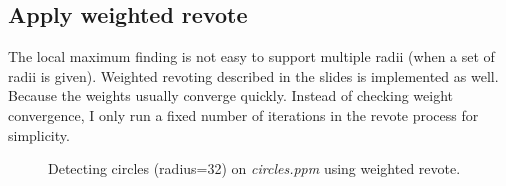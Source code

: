 \documentclass[paper=a4, fontsize=11pt]{scrartcl}
\begin{document}
\subsection{Apply weighted revote}

The local maximum finding is not easy to support multiple radii (when a set of radii is given).
Weighted revoting described in the slides is implemented as well.
Because the weights usually converge quickly.
Instead of checking weight convergence, I only run a fixed number of iterations in the revote process for simplicity.

\begin{figure}[h]
\centering
{}
\caption{Detecting circles (radius=32) on \emph{circles.ppm} using weighted revote.}
\label{fig:hough:simple_circle:32:weighted_vote}
\end{figure}
\end{document}
